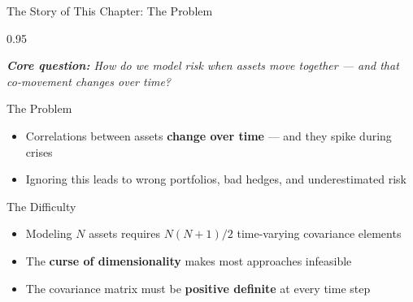 \documentclass[9pt, aspectratio=169, t]{beamer}
\begin{document}

\begin{frame}{The Story of This Chapter: The Problem}
    \begin{cminipage}{0.95\textwidth}
    {\footnotesize
    \textit{\textbf{Core question:} How do we model risk when assets move together --- and that co-movement changes over time?}
    \vspace{0.2cm}
    \begin{block}{The Problem}
        \begin{itemize}\setlength{\itemsep}{2pt}
            \item Correlations between assets \textbf{change over time} --- and they spike during crises
            \item Ignoring this leads to wrong portfolios, bad hedges, and underestimated risk
        \end{itemize}
    \end{block}
    \vspace{0.1cm}
    \begin{alertblock}{The Difficulty}
        \begin{itemize}\setlength{\itemsep}{2pt}
            \item Modeling $N$ assets requires $N(N+1)/2$ time-varying covariance elements
            \item The \textbf{curse of dimensionality} makes most approaches infeasible
            \item The covariance matrix must be \textbf{positive definite} at every time step
        \end{itemize}
    \end{alertblock}
    }
    \end{cminipage}
\end{frame}
\end{document}
